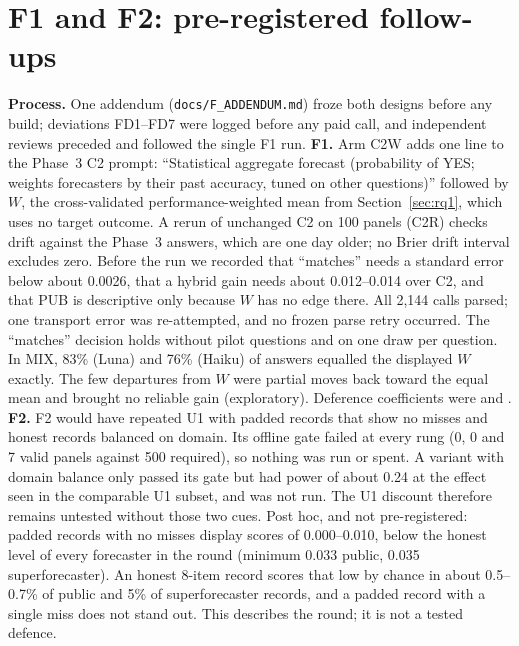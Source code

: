 \documentclass[11pt,letterpaper]{article}
\begin{document}
\section{F1 and F2: pre-registered follow-ups}\label{app:fone}
\textbf{Process.} One addendum (\texttt{docs/F\_ADDENDUM.md}) froze both designs before any build; deviations FD1--FD7
were logged before any paid call, and independent reviews preceded and followed the single F1 run.
\textbf{F1.} Arm C2W adds one line to the Phase~3 C2 prompt: ``Statistical aggregate forecast (probability of YES;
weights forecasters by their past accuracy, tuned on other questions)'' followed by $W$, the cross-validated
performance-weighted mean from Section~\ref{sec:rq1}, which uses no target outcome. A rerun of unchanged C2 on 100
panels (C2R) checks drift against the Phase~3 answers, which are one day older; no Brier drift interval excludes zero.
Before the run we recorded that ``matches'' needs a standard error below about 0.0026, that a hybrid gain needs about
0.012--0.014 over C2, and that PUB is descriptive only because $W$ has no edge there. All 2,144 calls parsed; one
transport error was re-attempted, and no frozen parse retry occurred. The ``matches'' decision holds without pilot
questions and on one draw per question. In MIX, 83\% (Luna) and 76\% (Haiku) of answers equalled the displayed $W$
exactly. The few departures from $W$ were partial moves back toward the equal mean and brought no reliable gain
(exploratory). Deference coefficients were \foneDefLuna{} and \foneDefHaiku.
\textbf{F2.} F2 would have repeated U1 with padded records that show no misses and honest records balanced on domain.
Its offline gate failed at every rung (0, 0 and 7 valid panels against 500 required), so nothing was run or spent. A
variant with domain balance only passed its gate but had power of about 0.24 at the effect seen in the comparable U1
subset, and was not run. The U1 discount therefore remains untested without those two cues. Post hoc, and not
pre-registered: padded records with no misses display scores of 0.000--0.010, below the honest level of every
forecaster in the round (minimum 0.033 public, 0.035 superforecaster). An honest 8-item record scores that low by
chance in about 0.5--0.7\% of public and 5\% of superforecaster records, and a padded record with a single miss does
not stand out. This describes the round; it is not a tested defence.
\end{document}
